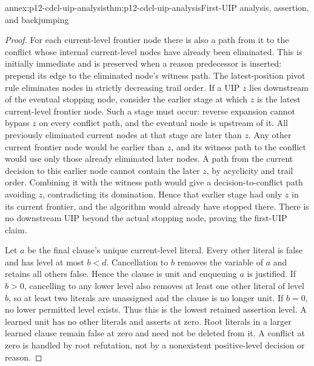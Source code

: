 \begin{annexitem}{annex:p12-cdcl-uip-analysis}{thm:p12-cdcl-uip-analysis}{First-UIP analysis, assertion, and backjumping}
\begin{proof}
For each current-level frontier node there is also a path from it to the
conflict whose internal current-level nodes have already been eliminated.
This is initially immediate and is preserved when a reason predecessor is
inserted: prepend its edge to the eliminated node's witness path.  The
latest-position pivot rule eliminates nodes in strictly decreasing trail
order.  If a UIP \(z\) lies downstream of the eventual stopping node,
consider the earlier stage at which \(z\) is the latest current-level
frontier node.  Such a stage must occur: reverse expansion cannot bypass
\(z\) on every conflict path, and the eventual node is upstream of it.
All previously eliminated current nodes at that stage are later than \(z\).
Any other current frontier node would be earlier than \(z\), and its witness
path to the conflict would use only those already eliminated later nodes.
A path from the current decision to this earlier node cannot contain the
later \(z\), by acyclicity and trail order.  Combining it with the witness
path would give a decision-to-conflict path avoiding \(z\), contradicting
its domination.  Hence that earlier stage had only \(z\) in its current
frontier, and the algorithm would already have stopped there.  There is no
downstream UIP beyond the actual stopping node, proving the first-UIP claim.

Let \(a\) be the final clause's unique current-level literal.  Every other
literal is false and has level at most \(b<d\).  Cancellation to \(b\)
removes the variable of \(a\) and retains all others false.  Hence the
clause is unit and enqueuing \(a\) is justified.  If \(b>0\), cancelling
to any lower level also removes at least one other literal of level \(b\),
so at least two literals are unassigned and the clause is no longer unit.
If \(b=0\), no lower permitted level exists.  Thus this is the lowest
retained assertion level.  A learned unit has no other literals and asserts
at zero.  Root literals in a larger learned clause remain false at zero and
need not be deleted from it.  A conflict at zero is handled by root
refutation, not by a nonexistent positive-level decision or reason.
\end{proof}
\end{annexitem}

